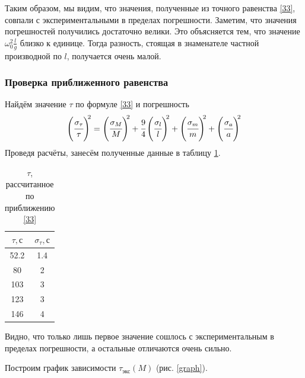 \documentclass[a4paper,12pt]{article}
\theoremstyle{plain} %
\theoremstyle{definition} %
\theoremstyle{remark} %
\begin{document}
Таким образом, мы видим, что значения, полученные из точного равенства \eqref{33}, совпали с экспериментальными в пределах погрешности. Заметим, что значения погрешностей получились достаточно велики. Это объясняется тем, что значение $\omega^2_0\frac{l}{g}$ близко к единице. Тогда разность, стоящая в знаменателе частной производной по $l$, получается очень малой.

\subsubsection{Проверка приближенного равенства}
Найдём значение $\tau$ по формуле \eqref{33} и погрешность
\begin{equation}
\left(\cfrac{\sigma_{\tau}}{\tau}\right)^{\!\!2}=\left(\cfrac{\sigma_{M}}{M}\right)^{\!\!2}+\cfrac{9}{4}\left(\cfrac{\sigma_{l}}{l}\right)^{\!\!2}+\left(\cfrac{\sigma_{m}}{m}\right)^{\!\!2}+\left(\cfrac{\sigma_{a}}{a}\right)^{\!\!2}
\label{37}
\end{equation}
Проведя расчёты, занесём полученные данные в таблицу \ref{my-label6}.
\begin{table}[h!]
	\centering
	\caption{$\tau$, рассчитанное по приближению \eqref{33}}
	\label{my-label6}
	\begin{tabular}{|c|c|}
		\hline
		$\tau, \text{с}$ & $\sigma_{\tau}, \text{с}$ \\ \hline
		52.2             & 1.4                       \\ \hline
		80               & 2                         \\ \hline
		103              & 3                         \\ \hline
		123              & 3                         \\ \hline
		146              & 4                         \\ \hline
	\end{tabular}
\end{table}

Видно, что только лишь первое значение сошлось с экспериментальным в пределах погрешности, а остальные отличаются очень сильно.

Построим график зависимости $\tau_{\text{экс}} (M)$ (рис. \ref{graph}).
\end{document}
